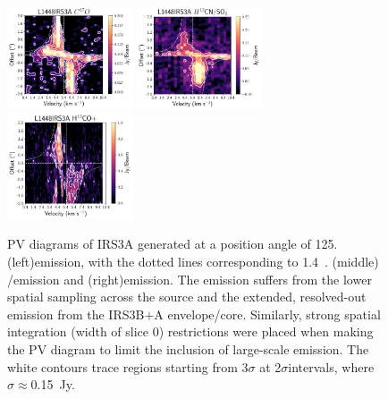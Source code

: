 \begin{figure}[H]
\begin{center}
\includegraphics[width=0.33\textwidth]{img/PV-Diagram_L1448IRS3B_C17O_clean_binnedwide.pdf}
\includegraphics[width=0.33\textwidth]{img/irs3a_h13cn_pv.pdf}
   \includegraphics[width=0.33\textwidth]{img/PV-Diagram_L1448IRS3B_H13COp_image_taper1500k-wide.pdf} %
\end{center}
\caption{PV diagrams of IRS3A generated at a position angle of 125\deg. (left)\cso\space emission, with the dotted lines corresponding to 1.4~\solm. (middle) \htcn/\sot\space emission and (right)\htcop\space emission. The emission suffers from the lower spatial sampling across the source and the extended, resolved-out emission from the IRS3B$+$A envelope/core. Similarly, strong spatial integration (width of slice 0) restrictions were placed when making the PV diagram to limit the inclusion of large-scale emission. The white contours trace regions starting from 3$\sigma$ at 2$\sigma$\space intervals, where $\sigma\approx$0.15~Jy.}\label{fig:l1448irs3a_cso_pv}
\end{figure}


